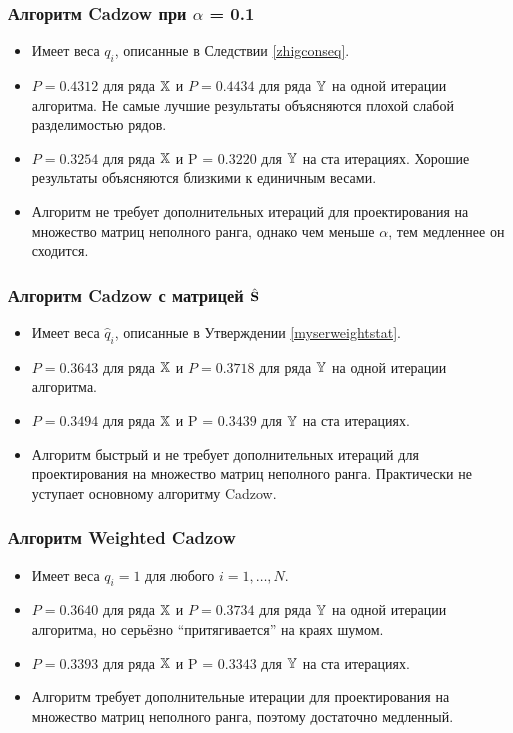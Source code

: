 \documentclass[12pt,a4paper,fleqn,leqno]{article}
\begin{document}
\subsubsection{Алгоритм Cadzow при $\alpha$ = 0.1}
\begin{itemize}
\item Имеет веса $q_i$, описанные в Следствии \ref{zhigconseq}.
\item $P = 0.4312$ для ряда $\mathbb{X}$ и $P = 0.4434$ для ряда $\mathbb{Y}$ на одной итерации алгоритма. Не самые лучшие результаты объясняются плохой слабой разделимостью рядов.
\item $P = 0.3254$ для ряда $\mathbb{X}$ и P = $0.3220$ для $\mathbb{Y}$ на ста итерациях. Хорошие результаты объясняются близкими к единичным весами.
\item Алгоритм не требует дополнительных итераций для проектирования на множество матриц неполного ранга, однако чем меньше $\alpha$, тем медленнее он сходится.
\end{itemize}

\subsubsection{Алгоритм Cadzow с матрицей $\hat{\mathbf{S}}$}
\begin{itemize}
\item Имеет веса $\hat q_i$, описанные в Утверждении \ref{myserweightstat}.
\item $P = 0.3643$ для ряда $\mathbb{X}$ и $P = 0.3718$ для ряда $\mathbb{Y}$ на одной итерации алгоритма.
\item $P = 0.3494$ для ряда $\mathbb{X}$ и P = $0.3439$ для $\mathbb{Y}$ на ста итерациях.
\item Алгоритм быстрый и не требует дополнительных итераций для проектирования на множество матриц неполного ранга. Практически не уступает основному алгоритму Cadzow.
\end{itemize}

\subsubsection{Алгоритм Weighted Cadzow}
\begin{itemize}
\item Имеет веса $q_i = 1$ для любого $i = 1, \ldots, N$.
\item $P = 0.3640$ для ряда $\mathbb{X}$ и $P = 0.3734$ для ряда $\mathbb{Y}$ на одной итерации алгоритма, но серьёзно ``притягивается'' на краях шумом.
\item $P = 0.3393$ для ряда $\mathbb{X}$ и P = $0.3343$ для $\mathbb{Y}$ на ста итерациях.
\item Алгоритм требует дополнительные итерации для проектирования на множество матриц неполного ранга, поэтому достаточно медленный.
\end{itemize}
\end{document}
